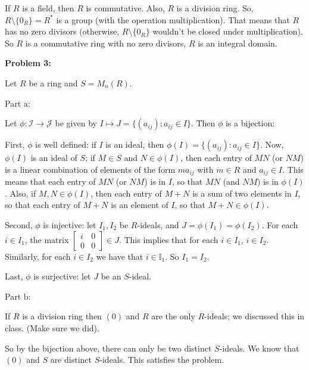 \documentclass[a4paper,12pt]{article}
\newcommand{\shunt}{\vspace{20mm}}
\newcommand{\I}{\mathbb{I}}
\newcommand{\scrI}{\mathcal{I}}
\newcommand{\scrJ}{\mathcal{J}}
\begin{document}
If $R$ is a field, then $R$ is commutative. Also, $R$ is a division ring. So, $R \setminus \{0_R\} = R^*$ is a group (with the operation multiplication). That means that $R$ has no zero divisors (otherwise, $R \setminus \{0_R\}$ wouldn't be closed under multiplication). So $R$ is a commutative ring with no zero divisors, $R$ is an integral domain.

\shunt

{\bf Problem 3:} %

Let $R$ be a ring and $S=M_n(R)$.

Part a:

Let $\phi: \scrI \to \scrJ$ be given by $I \mapsto J=\{(a_{ij}) : a_{ij} \in I\}$. Then $\phi$ is a bijection:

First, $\phi$ is well defined: if $I$ is an ideal, then $\phi(I) = \{(a_{ij}) : a_{ij} \in I\}$. Now, $\phi(I)$ is an ideal of $S$; if $M \in S$ and $N \in \phi(I)$, then each entry of $MN$ (or $NM$) is a linear combination of elements of the form $ma_{ij}$ with $m \in R$ and $a_{ij} \in I$. This means that each entry of $MN$ (or $NM$) is in $I$, so that $MN$ (and $NM$) is in $\phi(I)$. Also, if $M,N \in \phi(I)$, then each entry of $M+N$ is a sum of two elements in $I$, so that each entry of $M+N$ is an element of $I$, so that $M+N \in \phi(I)$.

Second, $\phi$ is injective: let $I_1,I_2$ be $R$-ideals, and $J=\phi(I_1)=\phi(I_2)$. For each $i \in I_1$, the matrix $\left[\begin{smallmatrix} i&0\\ 0&0 \end{smallmatrix}\right] \in J$. This implies that for each $i \in I_1$, $i \in I_2$. Similarly, for each $i \in I_2$ we have that $i \in \I_1$. So $I_1 = I_2$. 

Last, $\phi$ is surjective: let $J$ be an $S$-ideal. %

\shunt

Part b:

If $R$ is a division ring then $(0)$ and $R$ are the only $R$-ideals; we discussed this in class. (Make sure we did).

So by the bijection above, there can only be two distinct $S$-ideals. We know that $(0)$ and $S$ are distinct $S$-ideals. This satisfies the problem.

\shunt
\end{document}

